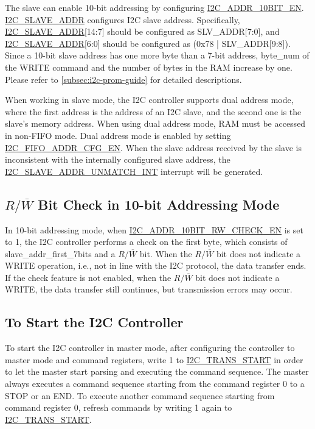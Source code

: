 \documentclass[main\_\_EN.tex]{subfiles}
\begin{document}
The slave can enable 10-bit addressing by configuring \hyperref[fielddesc:I2CADDR10BITEN]{I2C\_ADDR\_10BIT\_EN}. \hyperref[fielddesc:I2CSLAVEADDR]{I2C\_SLAVE\_ADDR} configures I2C slave address. Specifically, \hyperref[fielddesc:I2CSLAVEADDR]{I2C\_SLAVE\_ADDR}[14:7] should be configured as SLV\_ADDR[7:0], and  \hyperref[fielddesc:I2CSLAVEADDR]{I2C\_SLAVE\_ADDR}[6:0] should be configured as (0x78 | SLV\_ADDR[9:8]). Since a 10-bit slave address has one more byte than a 7-bit address, byte\_num of the WRITE command and the number of bytes in the RAM increase by one. Please refer to \ref{subsec:i2c-prom-guide} for detailed descriptions.

When working in slave mode, the I2C controller supports dual address mode, where the first address is the address of an I2C slave, and the second one is the slave's memory address. When using dual address mode, RAM must be accessed in non-FIFO mode. 
Dual address mode is enabled by setting \hyperref[fielddesc:I2CFIFOADDRCFGEN]{I2C\_FIFO\_ADDR\_CFG\_EN}. When the slave address received by the slave is inconsistent with the internally configured slave address, the \hyperref[int:i2c-slave-addr]{I2C\_SLAVE\_ADDR\_UNMATCH\_INT} interrupt will be generated. 

\subsection{\texorpdfstring{$R/\overline W$ Bit Check in 10-bit Addressing Mode}{R/W Bit Check in 10-bit Addressing Mode}}
In 10-bit addressing mode, when \hyperref[fielddesc:I2CADDR10BITRWCHECKEN]{I2C\_ADDR\_10BIT\_RW\_CHECK\_EN} is set to 1, the I2C controller performs a check on the first byte, which consists of slave\_addr\_first\_7bits and a $R/\overline W$ bit. When the $R/\overline W$ bit does not indicate a WRITE operation, i.e., not in line with the I2C protocol, the data transfer ends. If the check feature is not enabled, when the $R/\overline W$ bit does not indicate a WRITE, the data transfer still continues, but transmission errors may occur.

\subsection{To Start the I2C Controller}\label{subsubsec:i2c-start}
To start the I2C controller in master mode, after configuring the controller to master mode and command registers, write 1 to \hyperref[fielddesc:I2CTRANSSTART]{I2C\_TRANS\_START} in order to let the master start parsing and executing the command sequence. The master always executes a command sequence starting from the command register 0 to a STOP or an END. To execute another command sequence starting from command register 0, refresh commands by writing 1 again to \hyperref[fielddesc:I2CTRANSSTART]{I2C\_TRANS\_START}.
\end{document}

